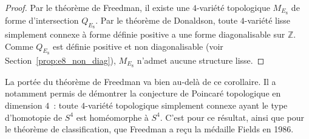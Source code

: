 \begin{proof}
  Par le théorème de Freedman, il existe une $4$-variété topologique $M_{E_8}$ de forme
  d'intersection $Q_{E_8}$. Par le théorème de Donaldson, toute $4$-variété lisse simplement
  connexe à forme définie positive a une forme diagonalisable sur $\mathbb{Z}$. Comme
  $Q_{E_8}$ est définie positive et non diagonalisable (voir Section~\ref{prop:e8_non_diag}),
  $M_{E_8}$ n'admet aucune structure lisse.
\end{proof}

\begin{remark}
  La portée du théorème de Freedman va bien au-delà de ce corollaire. Il a notamment permis
  de démontrer la conjecture de Poincaré topologique en dimension $4$~: toute $4$-variété
  topologique simplement connexe ayant le type d'homotopie de $S^4$ est homéomorphe à $S^4$.
  C'est pour ce résultat, ainsi que pour le théorème de classification, que Freedman a reçu
  la médaille Fields en 1986.
\end{remark}
